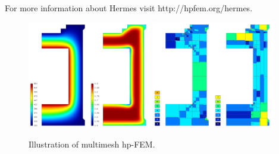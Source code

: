 \documentclass[12pt]{elsarticle}
\begin{document}
For more information about Hermes visit {http://hpfem.org/hermes}.
\vspace{-2mm}
\begin{figure}[H]
\centering
\includegraphics[height=4.7cm]{img/hermes_hm_sol.png}
\hspace{20mm}
\includegraphics[height=4.7cm]{img/hermes_hm_mesh.png}
\caption{Illustration of multimesh hp-FEM.}
\label{fig:hermes_hm}
\end{figure}
\vspace{-9mm}






\end{document}
